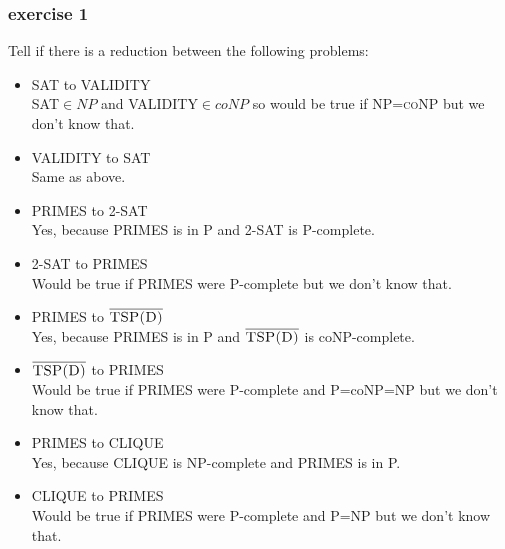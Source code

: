 \documentclass[12pt]{article}
\begin{document}
\subsubsection{exercise 1}
Tell if there is a reduction between the following problems:
\begin{itemize}
  \item \textsc{SAT} to \textsc{VALIDITY}\\
  \textsc{SAT}$\in NP$ and \textsc{VALIDITY}$\in coNP$ so would be true if \textsc{NP=coNP} but we don't know that.
  \item \textsc{VALIDITY} to \textsc{SAT}\\
  Same as above.
  \item \textsc{PRIMES} to \textsc{2-SAT}\\
  Yes, because \textsc{PRIMES} is in P and \textsc{2-SAT} is P-complete.
  \item \textsc{2-SAT} to \textsc{PRIMES}\\
  Would be true if \textsc{PRIMES} were P-complete but we don't know that.
  \item \textsc{PRIMES} to $\overline{\textsc{TSP(D)}}$\\
  Yes, because \textsc{PRIMES} is in P and $\overline{\textsc{TSP(D)}}$ is co\textsc{NP}-complete.
  \item $\overline{\textsc{TSP(D)}}$ to \textsc{PRIMES}\\
  Would be true if \textsc{PRIMES} were P-complete and P=co\textsc{NP}=\textsc{NP} but we don't know that.
  \item \textsc{PRIMES} to \textsc{CLIQUE}\\
  Yes, because \textsc{CLIQUE} is NP-complete and \textsc{PRIMES} is in P.
  \item \textsc{CLIQUE} to \textsc{PRIMES}\\
  Would be true if \textsc{PRIMES} were P-complete and P=\textsc{NP} but we don't know that.
\end{itemize}
\end{document}
